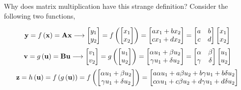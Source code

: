 \documentclass[aspectratio=169]{beamer}
\def\mf{\ensuremath\mathbf}
\def\lp{\ensuremath\left(}
\def\rp{\ensuremath\right)}
\begin{document}
\begin{frame}[t]{Why does matrix multiplication have this strange definition?}
  Consider the following two functions,
  \begin{small}
  \[ \mf{y} = f\lp\mf{x}\rp = \mf{A}\mf{x} \longrightarrow \begin{bmatrix}y_1 \\ y_2\end{bmatrix} = f\left(\begin{bmatrix}x_1 \\ x_2\end{bmatrix}\right) = \begin{bmatrix}ax_1 + bx_2 \\ cx_1 + dx_2\end{bmatrix} = \begin{bmatrix}a & b \\ c & d\end{bmatrix}\begin{bmatrix}x_1 \\ x_2\end{bmatrix}\]
  \[ \mf{v} = g\lp\mf{u}\rp = \mf{B}\mf{u} \longrightarrow \begin{bmatrix}v_1 \\ v_2\end{bmatrix} = g\left(\begin{bmatrix}u_1 \\ u_2\end{bmatrix}\right) = \begin{bmatrix}\alpha u_1 + \beta u_2 \\ \gamma u_1 + \delta u_2\end{bmatrix} = \begin{bmatrix}\alpha & \beta \\ \gamma & \delta\end{bmatrix}\begin{bmatrix}u_1 \\ u_2\end{bmatrix}\]
  \[ \begin{split}
  \mf{z} = h\left(\mf{u}\right) &= f\left(g\left(\mf{u}\right)\right) = f\left(\begin{bmatrix}\alpha u_1 + \beta u_2 \\ \gamma u_1 + \delta u_2\end{bmatrix}\right) = \begin{bmatrix}a\alpha u_1 + a\beta u_2 + b\gamma u_1 + b\delta u_2 \\ c\alpha u_1 + c\beta u_2 + d\gamma u_1 + d\delta u_2 \end{bmatrix}\\

\end{split}\]
\end{small}
\end{frame}
\end{document}
